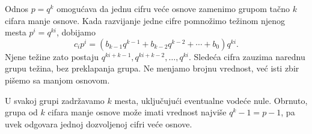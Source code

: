 
Odnos $p=q^k$ omogućava da jednu cifru veće osnove zamenimo grupom tačno $k$ cifara manje osnove. Kada razvijanje jedne cifre pomnožimo težinom njenog mesta $p^i=q^{ki}$, dobijamo
\[c_i p^i=(b_{k-1}q^{k-1}+b_{k-2}q^{k-2}+\cdots+b_0)q^{ki}.\]
Njene težine zato postaju $q^{ki+k-1},q^{ki+k-2},\ldots,q^{ki}$. Sledeća cifra zauzima narednu grupu težina, bez preklapanja grupa. Ne menjamo brojnu vrednost, već isti zbir pišemo sa manjom osnovom.

U svakoj grupi zadržavamo $k$ mesta, uključujući eventualne vodeće nule. Obrnuto, grupa od $k$ cifara manje osnove može imati vrednost najviše $q^k-1=p-1$, pa uvek odgovara jednoj dozvoljenoj cifri veće osnove.
